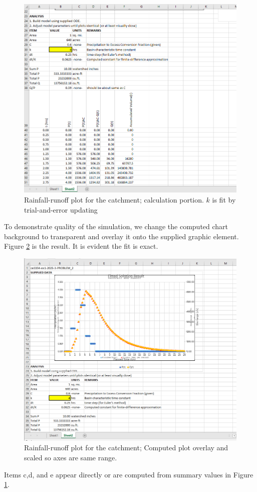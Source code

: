 \documentclass[12pt]{article}
\begin{document}
\begin{enumerate}
\begin{figure}[h!] %
   \centering
   \includegraphics[width=6in]{pr2_calcs.png} 
   \caption{Rainfall-runoff plot for the catchment; calculation portion.  $k$ is fit by trial-and-error updating}
   \label{fig:pr2_calcs}
\end{figure}

To demonstrate quality of the simulation, we change the computed chart background to transparent and overlay it onto the supplied graphic element.  Figure \ref{fig:pr2_overlay} is the result.  It is evident the fit is exact.

\begin{figure}[h!] %
   \centering
   \includegraphics[width=6in]{pr2_overlay.png} 
   \caption{Rainfall-runoff plot for the catchment; Computed plot overlay and scaled so axes are same range.}
   \label{fig:pr2_overlay}
\end{figure}
\clearpage
Items c,d, and e appear directly or are computed from summary values in Figure \ref{fig:pr2_calcs}.


\end{enumerate}
\end{document}
